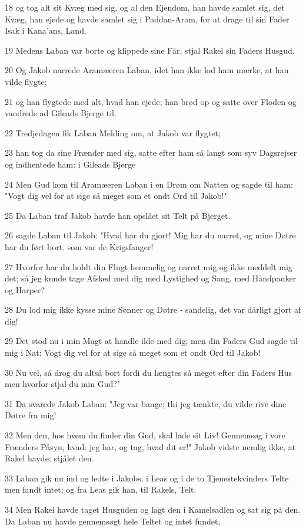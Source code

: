 \par 18 og tog alt sit Kvæg med sig, og al den Ejendom, han havde samlet sig, det Kvæg, han ejede og havde samlet sig i Paddan-Aram, for at drage til sin Fader Isak i Kana'ans, Land.
\par 19 Medens Laban var borte og klippede sine Får, stjal Rakel sin Faders Husgud.
\par 20 Og Jakob narrede Aramæeren Laban, idet han ikke lod ham mærke, at han vilde flygte;
\par 21 og han flygtede med alt, hvad han ejede; han brød op og satte over Floden og vandrede ad Gileads Bjerge til.
\par 22 Tredjedagen fik Laban Melding om, at Jakob var flygtet;
\par 23 han tog da sine Frænder med sig, satte efter ham så langt som syv Dagsrejser og indhentede ham: i Gileads Bjerge
\par 24 Men Gud kom til Aramæeren Laban i en Drøm om Natten og sagde til ham: "Vogt dig vel for at sige så meget som et ondt Ord til Jakob!"
\par 25 Da Laban traf Jakob havde han opslået sit Telt på Bjerget.
\par 26 sagde Laban til Jakob: "Hvad har du gjort! Mig har du narret, og mine Døtre har du ført bort. som var de Krigsfanger!
\par 27 Hvorfor har du holdt din Flugt hemmelig og narret mig og ikke meddelt mig det; så jeg kunde tage Afsked med dig med Lystighed og Sang, med Håndpauker og Harper?
\par 28 Du lod mig ikke kysse mine Sønner og Døtre - sandelig, det var dårligt gjort af dig!
\par 29 Det stod nu i min Magt at handle ilde med dig; men din Faders Gud sagde til mig i Nat: Vogt dig vel for at sige så meget som et ondt Ord til Jakob!
\par 30 Nu vel, så drog du altså bort fordi du længtes så meget efter din Faders Hus men hvorfor stjal du min Gud?"
\par 31 Da svarede Jakob Laban: "Jeg var bange; thi jeg tænkte, du vilde rive dine Døtre fra mig!
\par 32 Men den, hos hvem du finder din Gud, skal lade sit Liv! Gennemsøg i vore Frænders Påsyn, hvad: jeg har, og tag, hvad dit er!" Jakob vidste nemlig ikke, at Rakel havde; stjålet den.
\par 33 Laban gik nu ind og ledte i Jakobs, i Leas og i de to Tjenestekvinders Telte men fandt intet; og fra Leas gik han, til Rakels, Telt.
\par 34 Men Rakel havde taget Husguden og lagt den i Kamelsadlen og sat sig på den. Da Laban nu havde gennemsøgt hele Teltet og intet fundet,
